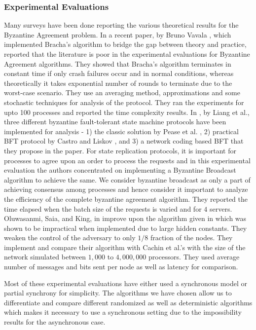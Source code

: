 \subsubsection{Experimental Evaluations}
Many surveys have been done reporting the various theoretical results for the Byzantine Agreement problem. In a recent paper, by Bruno Vavala \cite{VN12}, which implemented Bracha's algorithm \cite{Bracha84} to bridge the gap between theory and practice, reported that the literature is poor in the experimental evaluations for Byzantine Agreement algorithms. They showed that Bracha's algorithm terminates in constant time if only crash failures occur and in normal conditions, whereas theoretically it takes exponential number of rounds to terminate due to the worst-case scenario. They use an averaging method, approximations and some stochastic techniques for analysis of the protocol. They ran the experiments for upto 100 processes and reported the time complexity results. In \cite{LSV12}, by Liang et al., three different byzantine fault-tolerant state machine protocols have been implemented for analysis - 1) the classic solution by Pease et al. \cite{PeaseSL80}, 2) practical BFT protocol by Castro and Liskov \cite{CL02}, and 3) a network coding based BFT that they propose in the paper. For state replication protocols, it is important for processes to agree upon an order to process the requests and in this experimental evaluation the authors concentrated on implementing a Byzantine Broadcast algorithm to achieve the same. We consider byzantine broadcast as only a part of achieving consensus among processes and hence consider it important to analyze the efficiency of the complete byzantine agreement algorithm. They reported the time elapsed when the batch size of the requests is varied and for $4$ servers. Oluwasanmi, Saia, and King, in \cite{OSK10} improve upon the algorithm given in \cite{KS09} which was shown to be impractical when implemented due to large hidden constants. They weaken the control of the adversary to only $1/8$ fraction of the nodes. They implement and compare their algorithm with Cachin et al.'s \cite{CKS05} with the size of the network simulated between $1,000$ to $4,000,000$ processors. They used average number of messages and bits sent per node as well as latency for comparison.

Most of these experimental evaluations have either used a synchronous model or partial synchrony for simplicity. The algorithms we have chosen allow us to differentiate and compare different randomized as well as deterministic algorithms which makes it necessary to use a synchronous setting due to the impossibility results for the asynchronous case. 

